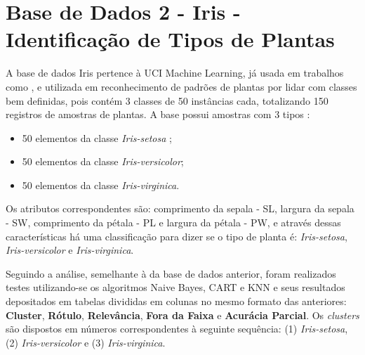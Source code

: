 \section{Base de Dados 2 - Iris - Identificação de Tipos de Plantas}

A base de dados Iris pertence à UCI Machine Learning, já usada em trabalhos como , e utilizada em reconhecimento de padrões de plantas por lidar com classes bem definidas, pois contém 3 classes de 50 instâncias cada, totalizando 150 registros de amostras de plantas. A base possui amostras com 3 tipos \cite{FISHER1936}: 

\begin{itemize}[noitemsep]
 \item 50 elementos da classe \textit{Iris-setosa} ;
 \item 50 elementos da classe \textit{Iris-versicolor};
 \item 50 elementos da classe \textit{Iris-virginica}.
\end{itemize}

% 
 
Os atributos correspondentes são: comprimento da sepala - SL, largura da sepala - SW, comprimento da pétala - PL e largura da pétala - PW, e através dessas características há uma classificação para dizer se o tipo de planta é: \textit{Iris-setosa}, \textit{Iris-versicolor} e \textit{Iris-virginica}. 

Seguindo a análise, semelhante à da base de dados anterior, foram realizados testes utilizando-se os algoritmos Naive Bayes, CART e KNN e seus resultados depositados em tabelas divididas em colunas no mesmo formato das anteriores: \textbf{Cluster}, \textbf{Rótulo}, \textbf{Relevância}, \textbf{Fora da Faixa} e \textbf{Acurácia Parcial}. Os \textit{clusters} são dispostos em números correspondentes à seguinte sequência: (1) \textit{Iris-setosa}, (2) \textit{Iris-versicolor} e (3) \textit{Iris-virginica}.
 
